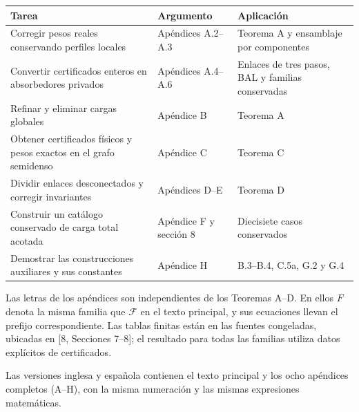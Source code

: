 \documentclass[spanish,11pt,a4paper]{article}
\begin{document}
{\begin{longtable}[]{@{}
  >{\raggedright\arraybackslash}p{}
  >{\raggedright\arraybackslash}p{}
  >{\raggedright\arraybackslash}p{}@{}}
\toprule\noalign{}
\begin{minipage}[b]{\linewidth}\raggedright
Tarea
\end{minipage} & \begin{minipage}[b]{\linewidth}\raggedright
Argumento
\end{minipage} & \begin{minipage}[b]{\linewidth}\raggedright
Aplicación
\end{minipage} \\
\midrule\noalign{}
\endhead
\bottomrule\noalign{}
\endlastfoot
Corregir pesos reales conservando perfiles locales & Apéndices A.2--A.3 & Teorema A y ensamblaje por componentes \\
Convertir certificados enteros en absorbedores privados & Apéndices A.4--A.6 & Enlaces de tres pasos, BAL y familias conservadas \\
Refinar y eliminar cargas globales & Apéndice B & Teorema A \\
Obtener certificados físicos y pesos exactos en el grafo semidenso & Apéndice C & Teorema C \\
Dividir enlaces desconectados y corregir invariantes & Apéndices D--E & Teorema D \\
Construir un catálogo conservado de carga total acotada & Apéndice F y sección 8 & Diecisiete casos conservados \\
Demostrar las construcciones auxiliares y sus constantes & Apéndice H & B.3--B.4, C.5a, G.2 y G.4 \\
\end{longtable}
}

Las letras de los apéndices son independientes de los Teoremas A--D. En ellos \(F\) denota la misma familia que \(\mathcal F\) en el texto principal, y sus ecuaciones llevan el prefijo correspondiente. Las tablas finitas están en las fuentes congeladas, ubicadas en {[}8, Secciones 7--8{]}; el resultado para todas las familias utiliza datos explícitos de certificados.

Las versiones inglesa y española contienen el texto principal y los ocho apéndices completos (A--H), con la misma numeración y las mismas expresiones matemáticas.
\end{document}
